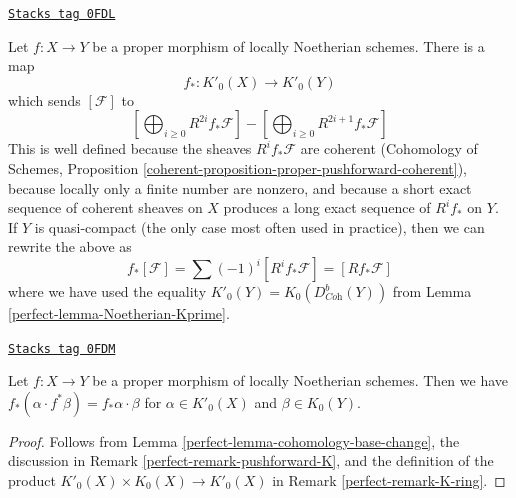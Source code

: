 \begin{remark}[Pushforward K]
\label{perfect-remark-pushforward-K}
\href{https://stacks.math.columbia.edu/tag/0FDL}{\texttt{Stacks tag 0FDL}}

Let $f : X \to Y$ be a proper morphism of locally Noetherian schemes.
There is a map
$$
f_* : K'_0(X) \longrightarrow K'_0(Y)
$$
which sends $[\mathcal{F}]$ to
$$
[\bigoplus\nolimits_{i \geq 0} R^{2i}f_*\mathcal{F}] -
[\bigoplus\nolimits_{i \geq 0} R^{2i + 1}f_*\mathcal{F}]
$$
This is well defined because the sheaves $R^if_*\mathcal{F}$
are coherent (Cohomology of Schemes, Proposition
\ref{coherent-proposition-proper-pushforward-coherent}), because locally
only a finite number are nonzero, and because
a short exact sequence of coherent sheaves on $X$ produces a long
exact sequence of $R^if_*$ on $Y$. If $Y$ is quasi-compact (the only
case most often used in practice), then we can rewrite the above as
$$
f_*[\mathcal{F}] = \sum (-1)^i[R^if_*\mathcal{F}] = [Rf_*\mathcal{F}]
$$
where we have used the equality $K'_0(Y) = K_0(D^b_{\textit{Coh}}(Y))$ from
Lemma \ref{perfect-lemma-Noetherian-Kprime}.
\end{remark}

\begin{lemma}
\label{perfect-lemma-projection-formula}
\href{https://stacks.math.columbia.edu/tag/0FDM}{\texttt{Stacks tag 0FDM}}

Let $f : X \to Y$ be a proper morphism of locally Noetherian schemes.
Then we have $f_*(\alpha \cdot f^*\beta) = f_*\alpha \cdot \beta$
for $\alpha \in K'_0(X)$ and $\beta \in K_0(Y)$.
\end{lemma}

\begin{proof}

Follows from Lemma \ref{perfect-lemma-cohomology-base-change}, the discussion in
Remark \ref{perfect-remark-pushforward-K}, and the definition of the product
$K'_0(X) \times K_0(X) \to K'_0(X)$ in Remark \ref{perfect-remark-K-ring}.
\end{proof}

